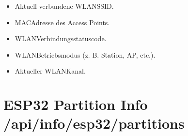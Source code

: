 \documentclass[letterpaper,10pt,english]{sphinxmanual}
\begin{document}
\begin{itemize}
\begin{description}
\begin{itemize}
\item {} 
\sphinxAtStartPar
{}  \textendash{} Aktuell verbundene WLAN\sphinxhyphen{}SSID.

\item {} 
\sphinxAtStartPar
{}  \textendash{} MAC\sphinxhyphen{}Adresse des Access Points.

\item {} 
\sphinxAtStartPar
{}  \textendash{} WLAN\sphinxhyphen{}Verbindungsstatuscode.

\item {} 
\sphinxAtStartPar
{}  \textendash{} WLAN\sphinxhyphen{}Betriebsmodus (z. B. Station, AP, etc.).

\item {} 
\sphinxAtStartPar
{}  \textendash{} Aktueller WLAN\sphinxhyphen{}Kanal.

\end{itemize}

\end{description}

\end{itemize}


\section{ESP32 Partition Info \textendash{} /api/info/esp32/partitions}
\label{\detokenize{agv_rest_api_info:esp32-partition-info-api-info-esp32-partitions}}\label{\detokenize{agv_rest_api_info:get-api-info-esp32-partitions}}
\end{document}
